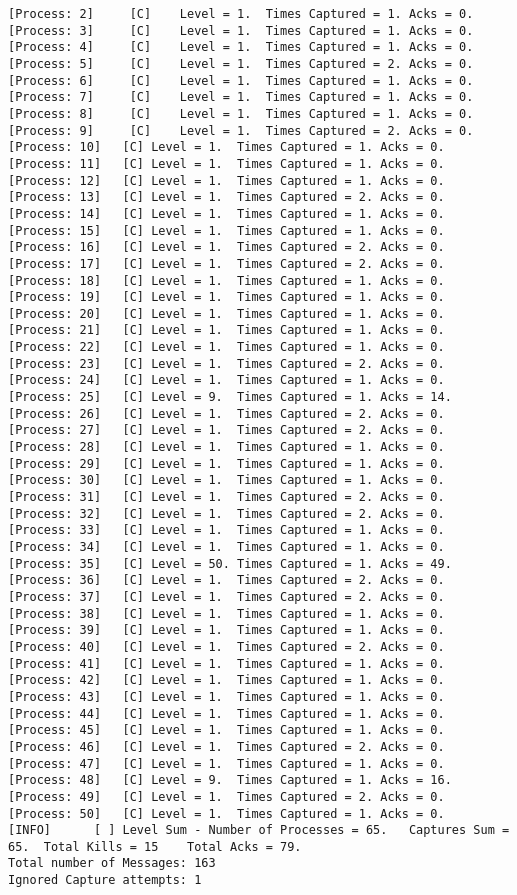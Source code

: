\begin{Verbatim}[commandchars=\\\{\},codes={\catcode`$=3\catcode`_=8},frame=single,label=Test 6 output]
[Process: 2]	 [C]	Level = 1.	Times Captured = 1.	Acks = 0.
[Process: 3]	 [C]	Level = 1.	Times Captured = 1.	Acks = 0.
[Process: 4]	 [C]	Level = 1.	Times Captured = 1.	Acks = 0.
[Process: 5]	 [C]	Level = 1.	Times Captured = 2.	Acks = 0.
[Process: 6]	 [C]	Level = 1.	Times Captured = 1.	Acks = 0.
[Process: 7]	 [C]	Level = 1.	Times Captured = 1.	Acks = 0.
[Process: 8]	 [C]	Level = 1.	Times Captured = 1.	Acks = 0.
[Process: 9]	 [C]	Level = 1.	Times Captured = 2.	Acks = 0.
[Process: 10]	[C]	Level = 1.	Times Captured = 1.	Acks = 0.
[Process: 11]	[C]	Level = 1.	Times Captured = 1.	Acks = 0.
[Process: 12]	[C]	Level = 1.	Times Captured = 1.	Acks = 0.
[Process: 13]	[C]	Level = 1.	Times Captured = 2.	Acks = 0.
[Process: 14]	[C]	Level = 1.	Times Captured = 1.	Acks = 0.
[Process: 15]	[C]	Level = 1.	Times Captured = 1.	Acks = 0.
[Process: 16]	[C]	Level = 1.	Times Captured = 2.	Acks = 0.
[Process: 17]	[C]	Level = 1.	Times Captured = 2.	Acks = 0.
[Process: 18]	[C]	Level = 1.	Times Captured = 1.	Acks = 0.
[Process: 19]	[C]	Level = 1.	Times Captured = 1.	Acks = 0.
[Process: 20]	[C]	Level = 1.	Times Captured = 1.	Acks = 0.
[Process: 21]	[C]	Level = 1.	Times Captured = 1.	Acks = 0.
[Process: 22]	[C]	Level = 1.	Times Captured = 1.	Acks = 0.
[Process: 23]	[C]	Level = 1.	Times Captured = 2.	Acks = 0.
[Process: 24]	[C]	Level = 1.	Times Captured = 1.	Acks = 0.
[Process: 25]	[C]	Level = 9.	Times Captured = 1.	Acks = 14.
[Process: 26]	[C]	Level = 1.	Times Captured = 2.	Acks = 0.
[Process: 27]	[C]	Level = 1.	Times Captured = 2.	Acks = 0.
[Process: 28]	[C]	Level = 1.	Times Captured = 1.	Acks = 0.
[Process: 29]	[C]	Level = 1.	Times Captured = 1.	Acks = 0.
[Process: 30]	[C]	Level = 1.	Times Captured = 1.	Acks = 0.
[Process: 31]	[C]	Level = 1.	Times Captured = 2.	Acks = 0.
[Process: 32]	[C]	Level = 1.	Times Captured = 2.	Acks = 0.
[Process: 33]	[C]	Level = 1.	Times Captured = 1.	Acks = 0.
[Process: 34]	[C]	Level = 1.	Times Captured = 1.	Acks = 0.
[Process: 35]	[C]	Level = 50.	Times Captured = 1.	Acks = 49.
[Process: 36]	[C]	Level = 1.	Times Captured = 2.	Acks = 0.
[Process: 37]	[C]	Level = 1.	Times Captured = 2.	Acks = 0.
[Process: 38]	[C]	Level = 1.	Times Captured = 1.	Acks = 0.
[Process: 39]	[C]	Level = 1.	Times Captured = 1.	Acks = 0.
[Process: 40]	[C]	Level = 1.	Times Captured = 2.	Acks = 0.
[Process: 41]	[C]	Level = 1.	Times Captured = 1.	Acks = 0.
[Process: 42]	[C]	Level = 1.	Times Captured = 1.	Acks = 0.
[Process: 43]	[C]	Level = 1.	Times Captured = 1.	Acks = 0.
[Process: 44]	[C]	Level = 1.	Times Captured = 1.	Acks = 0.
[Process: 45]	[C]	Level = 1.	Times Captured = 1.	Acks = 0.
[Process: 46]	[C]	Level = 1.	Times Captured = 2.	Acks = 0.
[Process: 47]	[C]	Level = 1.	Times Captured = 1.	Acks = 0.
[Process: 48]	[C]	Level = 9.	Times Captured = 1.	Acks = 16.
[Process: 49]	[C]	Level = 1.	Times Captured = 2.	Acks = 0.
[Process: 50]	[C]	Level = 1.	Times Captured = 1.	Acks = 0.
[INFO]		[ ]	Level Sum - Number of Processes = 65.	Captures Sum = 65.	Total Kills = 15	Total Acks = 79.
Total number of Messages: 163
Ignored Capture attempts: 1
	
	\end{Verbatim}

	\vspace{10pt}